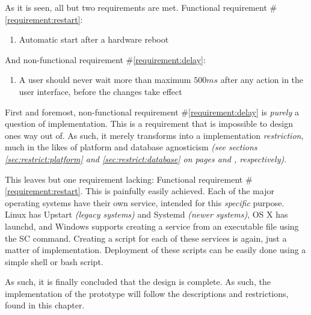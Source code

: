 		As it is seen, all but two requirements are met. Functional requirement \#\ref{requirement:restart}:
		\vspace{-3ex}\begin{enumerate}
			\setlength\itemsep{0.1em}
			\setcounter{enumi}{17-1}
			\item Automatic start after a hardware reboot
		\end{enumerate}
		And non-functional requirement \#\ref{requirement:delay}:
		\vspace{-3ex}\begin{enumerate}
			\setlength\itemsep{0.1em}
			\setcounter{enumi}{7-1}
			\item A user should never wait more than maximum $500ms$ after any action in the user interface, before the changes take effect 
		\end{enumerate}

		First and foremost, non-functional requirement \#\ref{requirement:delay} is \emph{purely} a question of implementation. This is a requirement that is impossible to design ones way out of. As such, it merely transforms into a implementation \emph{restriction}, much in the likes of platform and database agnosticism \emph{(see sections \ref{sec:restrict:platform} and \ref{sec:restrict:database} on pages \pageref{sec:restrict:platform} and \pageref{sec:restrict:database}, respectively)}.

		This leaves but one requirement lacking: Functional requirement \#\ref{requirement:restart}. This is painfully easily achieved. Each of the major operating systems have their own service, intended for this \emph{specific} purpose. Linux has Upstart \emph{(legacy systems)} and Systemd \emph{(newer systems)}\cite{autostart:linux}, OS X has launchd\cite{autostart:osx}, and Windows supports creating a service from an executable file using the SC command\cite{autostart:windows}. Creating a script for each of these services is again, just a matter of implementation. Deployment of these scripts can be easily done using a simple shell or bash script.

		As such, it is finally concluded that the design is complete. As such, the implementation of the prototype will follow the descriptions and restrictions, found in this chapter.


